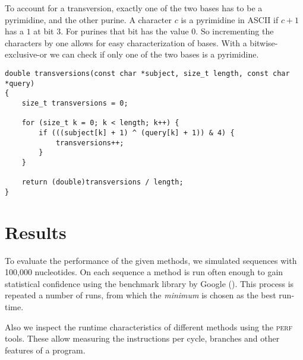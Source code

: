 \documentclass[10pt,letterpaper]{article}
\begin{document}
To account for a transversion, exactly one of the two bases has to be a pyrimidine, and the other purine. A character $c$ is a pyrimidine in ASCII if $c + 1$ has a $1$ at bit 3. For purines that bit has the value $0$. So incrementing the characters by one allows for easy characterization of bases. With a bitwise-exclusive-or we can check if only one of the two bases is a pyrimidine.

\begin{lstlisting}
double transversions(const char *subject, size_t length, const char *query)
{
    size_t transversions = 0;

    for (size_t k = 0; k < length; k++) {
        if (((subject[k] + 1) ^ (query[k] + 1)) & 4) {
            transversions++;
        }
    }

    return (double)transversions / length;
}
\end{lstlisting}


\section{Results}

To evaluate the performance of the given methods, we simulated sequences with 100{,}000 nucleotides. On each sequence a method is run often enough to gain statistical confidence using the benchmark library by Google (). This process is repeated a number of runs, from which the \emph{minimum} is chosen as the best run-time.

Also we inspect the runtime characteristics of different methods using the \textsc{perf} tools. These allow measuring the instructions per cycle, branches and other features of a program.
\end{document}
